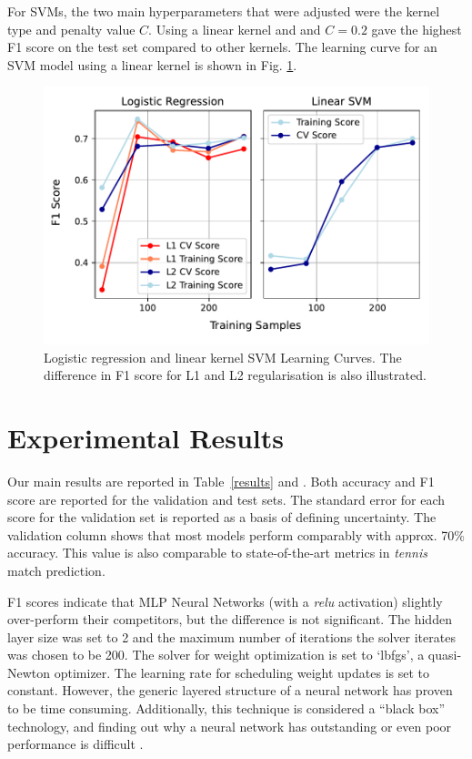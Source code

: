 
For SVMs, the two main hyperparameters that were adjusted were the kernel type and penalty value $C$. Using a linear kernel and and $C=0.2$ gave the highest F1 score on the test set compared to other kernels. The learning curve for an SVM model using a linear kernel is shown in Fig. \ref{fig:learningcurve}.

\begin{figure}[H]
\includegraphics[width=8.cm]{plots/learningcurves.pdf}
\caption{Logistic regression and linear kernel SVM Learning Curves. The difference in F1 score for L1 and L2 regularisation is also illustrated.}
\label{fig:learningcurve}
\centering
\end{figure}

\section{Experimental Results} \label{experresults}
Our main results are reported in Table~\ref{results} and .
Both accuracy and F1 score are reported for the validation and test sets. The standard error for each score for the validation set is reported as a basis of defining uncertainty. The validation column shows that most models perform comparably with approx. 70\% accuracy. This value is also comparable to state-of-the-art metrics in \textit{tennis} match prediction.

F1 scores indicate that MLP Neural Networks (with a \textit{relu} activation) slightly over-perform their competitors, but the difference is not significant. The hidden layer size was set to 2 and the maximum number of iterations the solver iterates was chosen to be 200. The solver for weight optimization is set to `lbfgs', a quasi-Newton optimizer. The learning rate for scheduling weight updates is set to constant. However, the generic layered structure of a neural network has proven to be time consuming. Additionally, this technique is considered a ``black box'' technology, and finding out why a neural network has outstanding or even poor performance is difficult \cite{noriega2005multilayer}.

